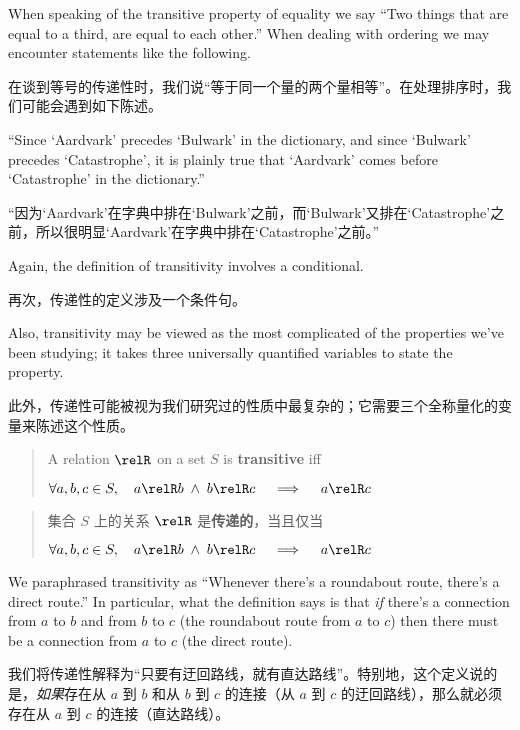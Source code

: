 When speaking of the transitive
property of equality we say ``Two things that are equal to a third, are equal to each other.''
When dealing with ordering we may encounter statements like the following.

在谈到等号的传递性时，我们说“等于同一个量的两个量相等”。在处理排序时，我们可能会遇到如下陈述。

``Since `Aardvark' precedes `Bulwark'  %
in the dictionary, and since `Bulwark' precedes `Catastrophe', it is plainly true that `Aardvark'  %
comes before `Catastrophe' in the dictionary.''

“因为‘Aardvark’在字典中排在‘Bulwark’之前，而‘Bulwark’又排在‘Catastrophe’之前，所以很明显‘Aardvark’在字典中排在‘Catastrophe’之前。”

Again, the definition of transitivity involves a conditional.

再次，传递性的定义涉及一个条件句。

Also, transitivity may be viewed 
as the most complicated of the properties we've been studying;
it takes three universally 
quantified variables to state the property.

此外，传递性可能被视为我们研究过的性质中最复杂的；它需要三个全称量化的变量来陈述这个性质。

\begin{quote}
A relation $\relR$ on a set $S$ is {\bf transitive} iff \newline
\centerline{ $\displaystyle \forall a,b,c \in S, \quad a \relR b \;
\land \; b \relR c \quad \implies \quad a \relR c$ }
\end{quote}

\begin{quote}
集合 $S$ 上的关系 $\relR$ 是{\bf 传递的}，当且仅当 \newline
\centerline{ $\displaystyle \forall a,b,c \in S, \quad a \relR b \;
\land \; b \relR c \quad \implies \quad a \relR c$ }
\end{quote}

We paraphrased transitivity as  ``Whenever there's a roundabout route, there's a direct route.''
In particular, what the definition says is that \emph{if} there's a connection from $a$ to $b$ and from
$b$ to $c$ (the roundabout route from $a$ to $c$) then there must be a connection from $a$ to $c$ (the direct
route).

我们将传递性解释为“只要有迂回路线，就有直达路线”。特别地，这个定义说的是，\emph{如果}存在从 $a$ 到 $b$ 和从 $b$ 到 $c$ 的连接（从 $a$ 到 $c$ 的迂回路线），那么就必须存在从 $a$ 到 $c$ 的连接（直达路线）。

